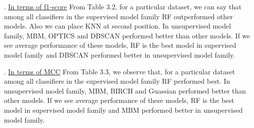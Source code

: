 . \underline{In terms of f1-score}\newline
From Table 3.2, for a particular dataset, we can say that among all classifiers in the supervised model family RF outperformed other models. Also we can place KNN at second position. In unsupervised model family, MBM, OPTICS and DBSCAN performed better than other models.\newline
If we see average performance of these models, RF is the best model in supervised model family and DBSCAN performed better in unsupervised model family.\newline

. \underline{In terms of MCC}\newline
From Table 3.3, we observe that, for a particular dataset among all classifiers in the supervised model family RF performed best. In unsupervised model family, MBM, BIRCH and Guassian performed better than other models.\newline
If we see average performance of these models, RF is the best model in supervised model family and MBM performed better in unsupervised model family.






